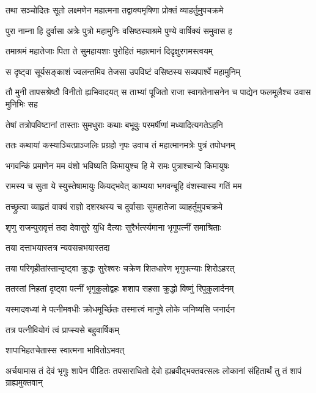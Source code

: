 
\twolineshloka
{तथा सञ्चोदितः सूतो लक्ष्मणेन महात्मना}
{तद्वाक्यमृषिणा प्रोक्तं व्याहर्तुमुपचक्रमे} %

\twolineshloka
{पुरा नाम्ना हि दुर्वासा अत्रेः पुत्रो महामुनिः}
{वसिष्ठस्याश्रमे पुण्ये वार्षिक्यं समुवास ह} %

\twolineshloka
{तमाश्रमं महातेजाः पिता ते सुमहायशाः}
{पुरोहितं महात्मानं दिदृक्षुरगमस्त्वयम्} %

\twolineshloka
{स दृष्ट्वा सूर्यसङ्काशं ज्वलन्तमिव तेजसा}
{उपविष्टं वसिष्ठस्य सव्यपार्श्वे महामुनिम्} %

\twolineshloka
{तौ मुनी तापसश्रेष्ठौ विनीतो ह्यभिवादयत्}
{स ताभ्यां पूजितो राजा स्वागतेनासनेन च पाद्येन फलमूलैश्च उवास मुनिभिः सह} %

\twolineshloka
{तेषां तत्रोपविष्टानां तास्ताः सुमधुराः कथाः}
{बभूवुः परमर्षीणां मध्यादित्यगतेऽहनि} %

\twolineshloka
{ततः कथायां कस्याञ्चित्प्राञ्जलिः प्रग्रहो नृपः}
{उवाच तं महात्मानमत्रेः पुत्रं तपोधनम्} %

\twolineshloka
{भगवन्किं प्रमाणेन मम वंशो भविष्यति}
{किमायुश्च हि मे रामः पुत्राश्चान्ये किमायुषः} %

\twolineshloka
{रामस्य च सुता ये स्युस्तेषामायुः कियद्भवेत्}
{काम्यया भगवन्बूहि वंशस्यास्य गतिं मम} %

\twolineshloka
{तच्छ्रुत्वा व्याहृतं वाक्यं राज्ञो दशरथस्य च}
{दुर्वासाः सुमहातेजा व्याहर्तुमुपचक्रमे} %

\twolineshloka
{शृणु राजन्पुरावृत्तं तदा देवासुरे युधि}
{दैत्याः सुरैर्भर्त्स्यमाना भृगुपत्नीं समाश्रिताः} %

\onelineshloka
{तया दत्ताभयास्तत्र न्यवसन्नभयास्तदा} %

\twolineshloka
{तया परिगृहीतांस्तान्दृष्ट्वा क्रुद्धः सुरेश्वरः}
{चक्रेण शितधारेण भृगुपत्न्याः शिरोऽहरत्} %

\twolineshloka
{ततस्तां निहतां दृष्ट्वा पत्नीं भृगुकुलोद्वहः}
{शशाप सहसा क्रुद्धो विष्णुं रिपुकुलार्दनम्} %

\twolineshloka
{यस्मादवध्यां मे पत्नीमवधीः क्रोधमूर्च्छितः}
{तस्मात्त्वं मानुषे लोके जनिष्यसि जनार्दन} %

\onelineshloka
{तत्र पत्नीवियोगं त्वं प्राप्स्यसे बहुवार्षिकम्} %

\onelineshloka
{शापाभिहतचेतास्स स्वात्मना भावितोऽभवत्} %

\threelineshloka
{अर्चयामास तं देवं भृगुः शापेन पीडितः}
{तपसाराधितो देवो ह्यब्रवीद्भक्तवत्सलः}
{लोकानां संहितार्थं तु तं शापं ग्राह्यमुक्तवान्} %

